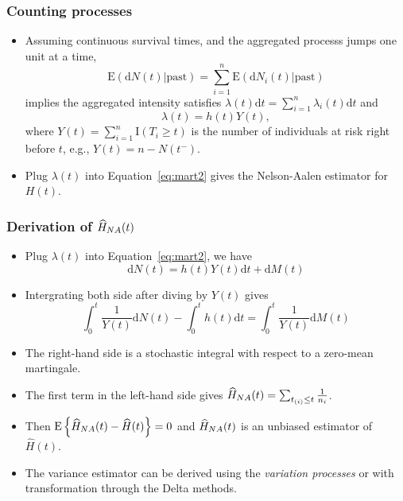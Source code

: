 \documentclass[10pt]{beamer}\usepackage[]{graphicx}\usepackage[]{color}
\newcommand{\dif}{\mathrm{d}}
\newcommand{\empr}[1]{{\emph{\color{red}#1}}}
\newcommand{\E}{\mathrm{E}}
\newcommand{\I}{\mathrm{I}}
\newcommand{\Hna}{\widehat{H}_{\scriptsize{NA}}}
\begin{document}
\begin{frame}
  \frametitle{Counting processes}
  \begin{itemize}  
  \item Assuming continuous survival times, and the aggregated processs jumps one unit at a time, 
    $$\E(\dif N(t)|\mbox{past}) =  \sum_{i = 1}^n\E(\dif N_i(t)|\mbox{past})$$
    implies the aggregated intensity satisfies $\lambda(t) \dif t = \sum_{i = 1}^n\lambda_i(t)\dif t$ and 
    $$\lambda(t) = h(t)Y(t), $$
    where $Y(t) = \sum_{i = 1}^n\I(T_i\ge t)$ is the number of individuals at risk right before $t$, 
    e.g., $Y(t) = n - N(t^-)$.
  \item Plug $\lambda(t)$ into Equation~\eqref{eq:mart2} gives the Nelson-Aalen estimator for $H(t)$.
  \end{itemize}
\end{frame} 

\begin{frame}
  \frametitle{Derivation of $\Hna(t)$}
  \begin{itemize}  
  \item Plug $\lambda(t)$ into Equation~\eqref{eq:mart2}, we have
    \begin{equation*}
      \dif N(t) = h(t) Y(t) \dif t + \dif M(t)
    \end{equation*}
  \item Intergrating both side after diving by $Y(t)$ gives
    \begin{equation*}
      \int_0^t\frac{1}{Y(t)}\dif N(t) - \int_0^th(t) \dif t = \int_0^t\frac{1}{Y(t)}\dif M(t)
    \end{equation*}
  \item The right-hand side is a stochastic integral with respect to a zero-mean martingale.
  \item The first term in the left-hand side gives $\Hna(t) = \sum_{t_{(i)}\le t}\frac{1}{n_i}$.
  \item Then $\E\left\{\Hna(t) - \widehat{H}(t)\right\} = 0$ and
    $\Hna(t)$ is an unbiased estimator of $\widehat{H}(t)$.
  \item The variance estimator can be derived using the \empr{variation processes} or 
    with transformation through the Delta methods.
  \end{itemize}
\end{frame} 
\end{document}

